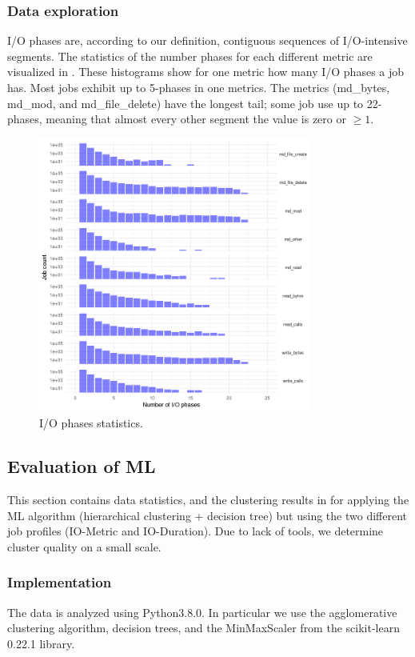 \documentclass[]{llncs}
\begin{document}
\subsubsection{Data exploration}
I/O phases are, according to our definition, contiguous sequences of I/O-intensive segments.
The statistics of the number phases for each different metric are visualized in .
These histograms show for one metric how many I/O phases a job has.
Most jobs exhibit up to 5-phases in one metrics.
The metrics (md\_bytes, md\_mod, and md\_file\_delete) have the longest tail; some job use up to 22-phases, meaning that almost every other segment the value is zero or $\geq 1$.



\begin{figure}
  \centering
  \includegraphics[width=3.55in,height=3.56in]{./media/image23.png}
  \caption{I/O phases statistics.}
  \label{fig:phases_stats}
\end{figure}


\subsection{Evaluation of ML}
This section contains data statistics, and the clustering results in  for applying the ML algorithm (hierarchical clustering + decision tree) but using the two different job profiles (IO-Metric and IO-Duration).
Due to lack of tools, we determine cluster quality on a small scale.

\subsubsection{Implementation}
The data is analyzed using Python3.8.0.
In particular we use the agglomerative clustering algorithm, decision trees, and the MinMaxScaler from the scikit-learn 0.22.1 library.
\end{document}
